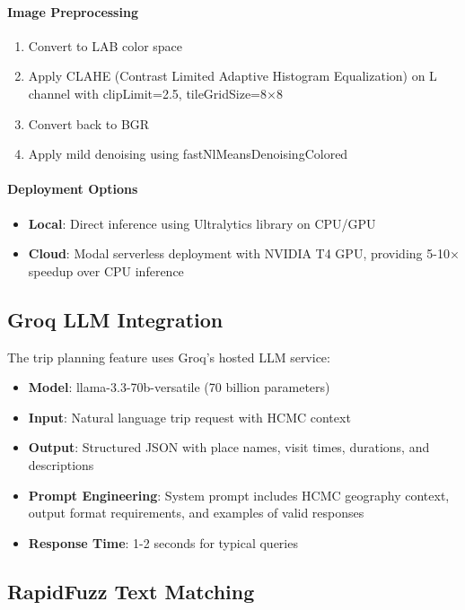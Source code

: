 \paragraph{Image Preprocessing}
\begin{enumerate}[noitemsep]
    \item Convert to LAB color space
    \item Apply CLAHE (Contrast Limited Adaptive Histogram Equalization) on L channel with clipLimit=2.5, tileGridSize=8×8
    \item Convert back to BGR
    \item Apply mild denoising using fastNlMeansDenoisingColored
\end{enumerate}

\paragraph{Deployment Options}
\begin{itemize}[noitemsep]
    \item \textbf{Local}: Direct inference using Ultralytics library on CPU/GPU
    \item \textbf{Cloud}: Modal serverless deployment with NVIDIA T4 GPU, providing 5-10× speedup over CPU inference
\end{itemize}

\subsection{Groq LLM Integration}

The trip planning feature uses Groq's hosted LLM service:

\begin{itemize}[noitemsep]
    \item \textbf{Model}: llama-3.3-70b-versatile (70 billion parameters)
    \item \textbf{Input}: Natural language trip request with HCMC context
    \item \textbf{Output}: Structured JSON with place names, visit times, durations, and descriptions
    \item \textbf{Prompt Engineering}: System prompt includes HCMC geography context, output format requirements, and examples of valid responses
    \item \textbf{Response Time}: 1-2 seconds for typical queries
\end{itemize}

\subsection{RapidFuzz Text Matching}

